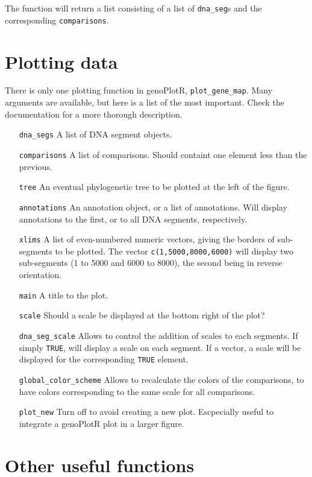 \documentclass[a4paper]{article}
\newcommand{\code}[1]{\texttt{#1}}
\newcommand{\pkg}[1]{{\normalfont\fontseries{b}\selectfont #1}}
\newcommand{\genoPlotR}{\pkg{genoPlotR}}
\begin{document}
The function will return a list consisting of a list of \code{dna\_seg}s
and the corresponding \code{comparisons}.

\section{Plotting data}

There is only one plotting function in \genoPlotR{}, \code{plot\_gene\_map}.
Many arguments are available, but here is a list of the most important. Check
the documentation for a more thorough description.
\begin{itemize}
  \item[\code{dna\_segs}] A list of DNA segment objects.
  \item[\code{comparisons}] A list of comparisons. Should containt one element
    less than the previous.
  \item[\code{tree}] An eventual phylogenetic tree to be plotted at the
    left of the figure.
  \item[\code{annotations}] An annotation object, or a list of annotations. 
    Will display annotations to the first, or to all DNA segments, respectively.
  \item[\code{xlims}] A list of even-numbered numeric vectors, giving the
    borders of sub-segments to be plotted. The vector \code{c(1,5000,8000,6000)}
    will display two sub-segments (1 to 5000 and 6000 to 8000), the second 
    being in reverse orientation.
  \item[\code{main}] A title to the plot.
  \item[\code{scale}] Should a scale be displayed at the bottom right of the
    plot?
  \item[\code{dna\_seg\_scale}] Allows to control the addition of scales
    to each segments. If simply \code{TRUE}, will display a scale on each
    segment. If a vector, a scale will be displayed for the corresponding 
    \code{TRUE} element.
  \item[\code{global\_color\_scheme}] Allows to recalculate the colors of 
    the comparisons, to have colors corresponding to the same scale for all 
    comparisons.
  \item[\code{plot\_new}] Turn off to avoid creating a new plot. Escpecially
    useful to integrate a \genoPlotR{} plot in a larger figure.
\end{itemize}

\section{Other useful functions}
\end{document}
